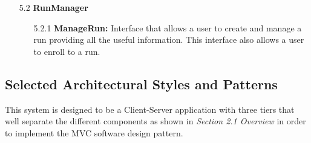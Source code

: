 \begin{center}
\begin{enumerate}
\item[5.2] \textbf{RunManager}
	\begin{enumerate}[nolistsep]
		\item[5.2.1] \textbf{ManageRun:} Interface that allows a user to create and manage a run providing all the useful information. This interface also allows a user to enroll to a run.
	\end{enumerate}		
\end{enumerate}
\clearpage
\end{center}



\subsection{Selected Architectural Styles and Patterns}

This system is designed to be a Client-Server application with three tiers that well separate the different components as shown in \textit{Section 2.1 Overview} in order to implement the MVC software design pattern.

